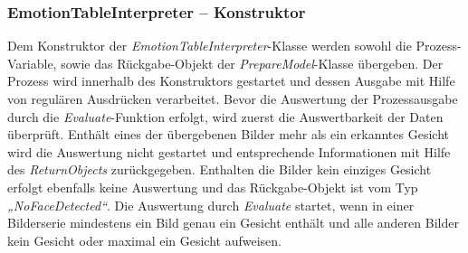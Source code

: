 \documentclass[10pt,a4paper]{report}
\begin{document}
\subsubsection{EmotionTableInterpreter – Konstruktor}
Dem Konstruktor der \textit{EmotionTableInterpreter}-Klasse werden sowohl die Prozess-Variable, sowie das Rückgabe-Objekt der \textit{PrepareModel}-Klasse übergeben. Der Prozess wird innerhalb des Konstruktors gestartet und dessen Ausgabe mit Hilfe von regulären Ausdrücken verarbeitet. Bevor die Auswertung der Prozessausgabe durch die \textit{Evaluate}-Funktion erfolgt, wird zuerst die Auswertbarkeit der Daten überprüft. Enthält eines der übergebenen Bilder mehr als ein erkanntes Gesicht wird die Auswertung nicht gestartet und entsprechende Informationen mit Hilfe des \textit{ReturnObjects} zurückgegeben. Enthalten die Bilder kein einziges Gesicht erfolgt ebenfalls keine Auswertung und das Rückgabe-Objekt ist vom Typ \textit{„NoFaceDetected“}. Die Auswertung durch \textit{Evaluate} startet, wenn in einer Bilderserie mindestens ein Bild genau ein Gesicht enthält und alle anderen Bilder kein Gesicht oder maximal ein Gesicht aufweisen.
\end{document}
